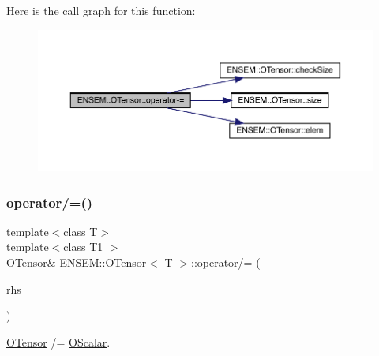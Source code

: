 Here is the call graph for this function\+:
\nopagebreak
\begin{figure}[H]
\begin{center}
\leavevmode
\includegraphics[width=350pt]{da/d8a/classENSEM_1_1OTensor_a8a087d8889bb41eafd237e270e4182fa_cgraph}
\end{center}
\end{figure}
\mbox{\label{classENSEM_1_1OTensor_a02520659679c7946a5bb0ce75b3824cb}} 
\subsubsection{\texorpdfstring{operator/=()}{operator/=()}\hspace{0.1cm}{\footnotesize\ttfamily [1/6]}}
{\footnotesize\ttfamily template$<$class T$>$ \\
template$<$class T1 $>$ \\
\mbox{\hyperlink{classENSEM_1_1OTensor}{O\+Tensor}}\& \mbox{\hyperlink{classENSEM_1_1OTensor}{E\+N\+S\+E\+M\+::\+O\+Tensor}}$<$ T $>$\+::operator/= (\begin{DoxyParamCaption}\item[{const \mbox{\hyperlink{classENSEM_1_1OScalar}{O\+Scalar}}$<$ T1 $>$ \&}]{rhs }\end{DoxyParamCaption})\hspace{0.3cm}{\ttfamily [inline]}}



\mbox{\hyperlink{classENSEM_1_1OTensor}{O\+Tensor}} /= \mbox{\hyperlink{classENSEM_1_1OScalar}{O\+Scalar}}. 

